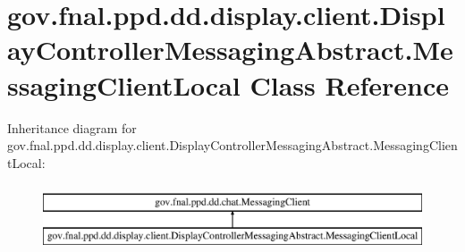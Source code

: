 \hypertarget{classgov_1_1fnal_1_1ppd_1_1dd_1_1display_1_1client_1_1DisplayControllerMessagingAbstract_1_1MessagingClientLocal}{\section{gov.\-fnal.\-ppd.\-dd.\-display.\-client.\-Display\-Controller\-Messaging\-Abstract.\-Messaging\-Client\-Local Class Reference}
\label{classgov_1_1fnal_1_1ppd_1_1dd_1_1display_1_1client_1_1DisplayControllerMessagingAbstract_1_1MessagingClientLocal}
}
Inheritance diagram for gov.\-fnal.\-ppd.\-dd.\-display.\-client.\-Display\-Controller\-Messaging\-Abstract.\-Messaging\-Client\-Local\-:\begin{figure}[H]
\begin{center}
\leavevmode
\includegraphics[height=2.000000cm]{classgov_1_1fnal_1_1ppd_1_1dd_1_1display_1_1client_1_1DisplayControllerMessagingAbstract_1_1MessagingClientLocal}
\end{center}
\end{figure}
